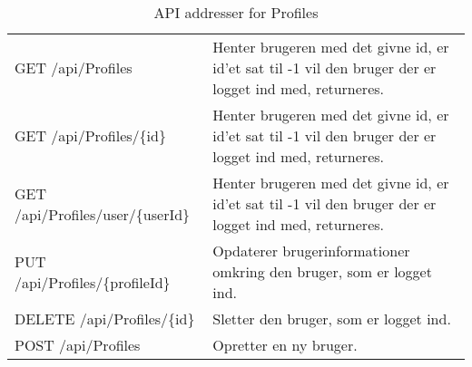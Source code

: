 \begin{table}[H]
	\centering
	\caption{API addresser for Profiles}
	\label{tab:web_user}
	\begin{tabular}{|L{0.3\textwidth}|L{0.70\textwidth}|}
		\hline
		\\
		\hline
		GET \newline
		/api/Profiles &
		Henter brugeren med det givne id, er id'et sat til -1 vil den bruger der er logget ind med, returneres. \\
        \hline
        GET \newline
		/api/Profiles/\{id\} &
		Henter brugeren med det givne id, er id'et sat til -1 vil den bruger der er logget ind med, returneres. \\
        \hline
        GET \newline
		/api/Profiles/user/\{userId\} &
		Henter brugeren med det givne id, er id'et sat til -1 vil den bruger der er logget ind med, returneres. \\
		\hline
		PUT \newline
		/api/Profiles/\{profileId\} &
		Opdaterer brugerinformationer omkring den bruger, som er logget ind. \\
		\hline
		DELETE \newline
		/api/Profiles/\{id\} &
		Sletter den bruger, som er logget ind. \\
		\hline
		POST \newline
		/api/Profiles &
		Opretter en ny bruger. \\
		\hline
		
	\end{tabular}
\end{table}

